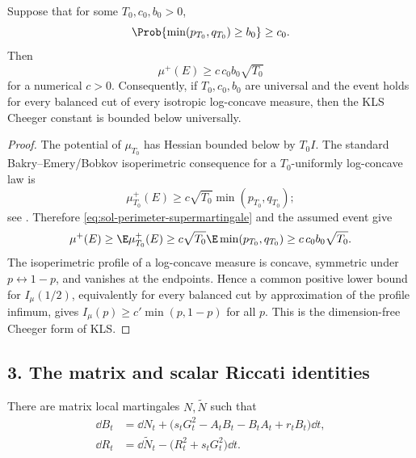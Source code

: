 \documentclass[../main.tex]{subfiles}
\begin{document}
\begin{lemma}[= Lemma~\ref{lem:survival-implies-kls}]
\label{lem:sol-survival-implies-kls}
Suppose that for some $T_0,c_0,b_0>0$,
\[
 \Prob\{\min(p_{T_0},q_{T_0})\ge b_0\}\ge c_0.
\]
Then
\[
 \mu^+(E)\ge c\,c_0b_0\sqrt{T_0}
\]
for a numerical $c>0$.  Consequently, if $T_0,c_0,b_0$ are universal and the event holds for
every balanced cut of every isotropic log-concave measure, then the KLS Cheeger constant is
bounded below universally.
\end{lemma}

\begin{proof}
The potential of $\mu_{T_0}$ has Hessian bounded below by $T_0I$.  The standard
Bakry--Emery/Bobkov isoperimetric consequence for a $T_0$-uniformly log-concave law is
\[
 \mu_{T_0}^+(E)\ge c\sqrt{T_0}\min(p_{T_0},q_{T_0});
\]
see \cite{BakryGentilLedoux2014,Bobkov1999LogConcave,Milman2009Isoperimetric}.  Therefore
\eqref{eq:sol-perimeter-supermartingale} and the assumed event give
\[
 \mu^+(E)\ge\E\mu_{T_0}^+(E)
 \ge c\sqrt{T_0}\E\min(p_{T_0},q_{T_0})
 \ge c\,c_0b_0\sqrt{T_0}.
\]
The isoperimetric profile of a log-concave measure is concave, symmetric under
$p\leftrightarrow1-p$, and vanishes at the endpoints.  Hence a common positive lower bound for
$I_\mu(1/2)$, equivalently for every balanced cut by approximation of the profile infimum,
gives $I_\mu(p)\ge c'\min(p,1-p)$ for all $p$.  This is the dimension-free Cheeger form of
KLS.
\end{proof}

\subsection*{3. The matrix and scalar Riccati identities}

\begin{lemma}[= Lemma~\ref{lem:matrix-riccati}]
\label{lem:sol-matrix-riccati}
There are matrix local martingales $N,\widetilde N$ such that
\begin{align}
 \dd B_t&=\dd N_t+
 \bigl(s_tG_t^2-A_tB_t-B_tA_t+r_tB_t\bigr)\dd t,
 \label{eq:sol-dB}\\
 \dd R_t&=\dd\widetilde N_t-
 \bigl(R_t^2+s_tG_t^2\bigr)\dd t.
 \label{eq:sol-dR}
\end{align}
\end{lemma}
\end{document}
